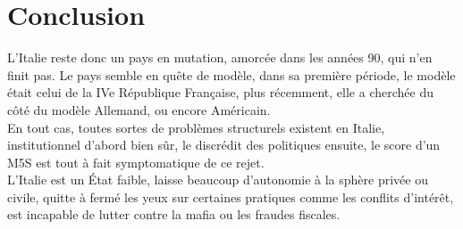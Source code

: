 \documentclass[10pt, a4paper, openany]{book}
\begin{document}
\section{Conclusion}

L'Italie reste donc un pays en mutation, amorcée dans les années 90, qui n'en finit pas. Le pays semble en quête de modèle, dans sa première période, le modèle était celui de la IVe République Française, plus récemment, elle a cherchée du côté du modèle Allemand, ou encore Américain. \\
En tout cas, toutes sortes de problèmes structurels existent en Italie, institutionnel d'abord bien sûr, le discrédit des politiques ensuite, le score d'un M5S est tout à fait symptomatique de ce rejet. \\
L'Italie est un État faible, laisse beaucoup d'autonomie à la sphère privée ou civile, quitte à fermé les yeux sur certaines pratiques comme les conflits d'intérêt, est incapable de lutter contre la mafia ou les fraudes fiscales.
\end{document}
